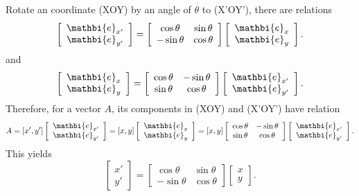 \documentclass[oneside]{book}
\begin{document}
Rotate an coordinate (XOY) by an angle of $\theta$ to (X'OY'), there are relations
\begin{equation}
\left[\begin{array}{c}
\mathbi{e}_{x'} \\
\mathbi{e}_{y'}
\end{array}\right]=\left[\begin{array}{cc}
\cos\theta & \sin \theta  \\
-\sin\theta &  \cos \theta       
\end{array}\right]\left[\begin{array}{c}
\mathbi{e}_{x} \\
\mathbi{e}_{y}
\end{array}\right].
\end{equation}
and 
\begin{equation}
\left[\begin{array}{c}
\mathbi{e}_{x} \\
\mathbi{e}_{y}
\end{array}\right]=\left[\begin{array}{cc}
\cos\theta & -\sin \theta  \\
\sin\theta &  \cos \theta       
\end{array}\right]\left[\begin{array}{c}
\mathbi{e}_{x'} \\
\mathbi{e}_{y'}
\end{array}\right].
\end{equation}
Therefore, for a vector $A$, its components in (XOY) and (X'OY') have relation 
\begin{equation}
A=[x', y'] \left[\begin{array}{c}
\mathbi{e}_{x'} \\
\mathbi{e}_{y'}
\end{array}\right] = [x, y]\left[\begin{array}{c}
\mathbi{e}_{x} \\
\mathbi{e}_{y}
\end{array}\right]=[x, y] \left[\begin{array}{cc}
\cos\theta & -\sin \theta  \\
\sin\theta &  \cos \theta       
\end{array}\right]\left[\begin{array}{c}
\mathbi{e}_{x'} \\
\mathbi{e}_{y'}
\end{array}\right].
\end{equation}
This yields
\begin{equation}
\left[\begin{array}{c}
x' \\
y'
\end{array}\right]=\left[\begin{array}{cc}
\cos\theta & \sin \theta  \\
-\sin\theta &  \cos \theta       
\end{array}\right]\left[\begin{array}{c}
x \\
y
\end{array}\right].
\end{equation}
\end{document}
